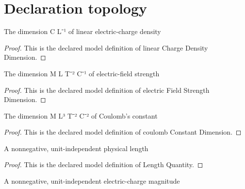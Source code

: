 \section{Declaration topology}
\begin{definition}
  \label{def:physics:phyx-mini-0835:phyxminiproblems-problemphyxmini0835-linearchargedensitydimension}
  The dimension C L⁻¹ of linear electric-charge density
\end{definition}
\begin{proof}
  This is the declared model definition of linear Charge Density Dimension.
\end{proof}
\begin{definition}
  \label{def:physics:phyx-mini-0835:phyxminiproblems-problemphyxmini0835-electricfieldstrengthdimension}
  The dimension M L T⁻² C⁻¹ of electric-field strength
\end{definition}
\begin{proof}
  This is the declared model definition of electric Field Strength Dimension.
\end{proof}
\begin{definition}
  \label{def:physics:phyx-mini-0835:phyxminiproblems-problemphyxmini0835-coulombconstantdimension}
  The dimension M L³ T⁻² C⁻² of Coulomb's constant
\end{definition}
\begin{proof}
  This is the declared model definition of coulomb Constant Dimension.
\end{proof}
\begin{definition}
  \label{def:physics:phyx-mini-0835:phyxminiproblems-problemphyxmini0835-lengthquantity}
  A nonnegative, unit-independent physical length
\end{definition}
\begin{proof}
  This is the declared model definition of Length Quantity.
\end{proof}
\begin{definition}
  \label{def:physics:phyx-mini-0835:phyxminiproblems-problemphyxmini0835-chargemagnitudequantity}
  A nonnegative, unit-independent electric-charge magnitude
\end{definition}
